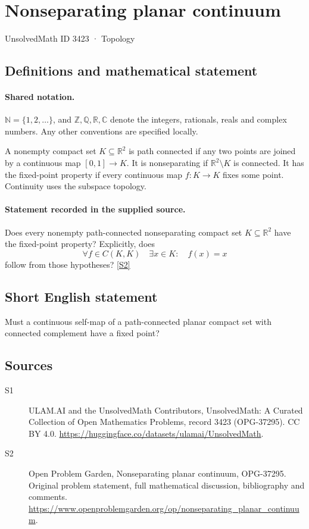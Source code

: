 \documentclass[11pt]{article}
\newcommand{\sref}[2]{\hyperlink{source:#1:#2}{[S#2]}}
\begin{document}
\setcounter{section}{3422}
\section{Nonseparating planar continuum}\label{3423}
{\small\sffamily UnsolvedMath ID 3423 · Topology}
\subsection{Definitions and mathematical statement}

\paragraph{Shared notation.}$\mathbb N=\{1,2,\ldots\}$, and $\mathbb Z,\mathbb Q,\mathbb R,\mathbb C$ denote the integers, rationals, reals and complex numbers. Any other conventions are specified locally.


A nonempty compact set $K\subseteq\mathbb R^2$ is path connected if any two points are joined by a continuous map $[0,1]\to K$. It is nonseparating if $\mathbb R^2\setminus K$ is connected. It has the fixed-point property if every continuous map $f:K\to K$ fixes some point. Continuity uses the subspace topology.
\paragraph{Statement recorded in the supplied source.}
Does every nonempty path-connected nonseparating compact set $K\subseteq\mathbb R^2$ have the fixed-point property? Explicitly, does
\[
 \forall f\in C(K,K)\quad\exists x\in K:\quad f(x)=x
\]
follow from those hypotheses? \sref{3423}{2}
\subsection{Short English statement}
Must a continuous self-map of a path-connected planar compact set with connected complement have a fixed point?
\subsection{Sources}
\begin{description}
\item[\hypertarget{source:3423:1}{S1}] ULAM.AI and the UnsolvedMath Contributors, UnsolvedMath: A Curated Collection of Open Mathematics Problems, record 3423 (OPG-37295). CC BY 4.0. \url{https://huggingface.co/datasets/ulamai/UnsolvedMath}.
\item[\hypertarget{source:3423:2}{S2}] Open Problem Garden, Nonseparating planar continuum, OPG-37295. Original problem statement, full mathematical discussion, bibliography and comments. \url{https://www.openproblemgarden.org/op/nonseparating_planar_continuum}.
\end{description}
\label{end:3423}
\end{document}
